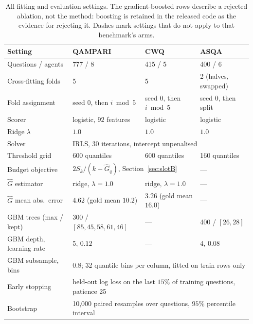 \documentclass[11pt]{article}
\begin{document}
\begin{table}[t]
  \caption{All fitting and evaluation settings. The gradient-boosted rows describe a rejected ablation, not the method: boosting is retained in the released code as the evidence for rejecting it. Dashes mark settings that do not apply to that benchmark's arms.}
  \label{tab:hyper}
  \centering
  \begin{tabular}{llll}
    \toprule
    Setting & QAMPARI & CWQ & ASQA \\
    \midrule
    Questions / agents          & 777 / 8 & 415 / 5 & 400 / 6 \\
    Cross-fitting folds         & 5 & 5 & 2 (halves, swapped) \\
    Fold assignment             & seed 0, then $i \bmod 5$ & seed 0, then $i \bmod 5$ & seed 0, then split \\
    \midrule
    Scorer                      & logistic, 92 features & logistic & logistic \\
    Ridge $\lambda$             & $1.0$ & $1.0$ & $1.0$ \\
    Solver                      & \multicolumn{3}{l}{IRLS, 30 iterations, intercept unpenalised} \\
    Threshold grid              & 600 quantiles & 600 quantiles & 160 quantiles \\
    \midrule
    Budget objective            & \multicolumn{2}{l}{$2S_k / (k + \hat{G}_q)$, Section~\ref{sec:slotB}} & --- \\
    $\hat{G}$ estimator         & ridge, $\lambda = 1.0$ & ridge, $\lambda = 1.0$ & --- \\
    $\hat{G}$ mean abs.\ error  & $4.62$ (gold mean $10.2$) & $3.26$ (gold mean $16.0$) & --- \\
    \midrule
    GBM trees (max / kept)      & 300 / $[85, 45, 58, 61, 46]$ & --- & 400 / $[26, 28]$ \\
    GBM depth, learning rate    & 5, $0.12$ & --- & 4, $0.08$ \\
    GBM subsample, bins         & \multicolumn{3}{l}{$0.8$; 32 quantile bins per column, fitted on train rows only} \\
    Early stopping              & \multicolumn{3}{l}{held-out log loss on the last $15\%$ of training questions, patience 25} \\
    \midrule
    Bootstrap                   & \multicolumn{3}{l}{10,000 paired resamples over questions, $95\%$ percentile interval} \\
    \bottomrule
  \end{tabular}
\end{table}
\end{document}
